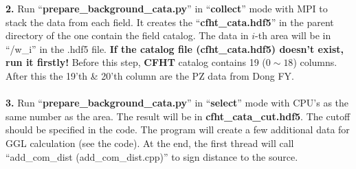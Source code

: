 \documentclass{article}
\begin{document}
\noindent\textbf{2.} Run ``\textbf{prepare\_background\_cata.py}'' in ``\textbf{collect}'' mode with MPI to stack the data from each field. It creates the ``\textbf{cfht\_cata.hdf5}'' in the parent directory of the one contain the field catalog. The data in $i$-th area will be in ``/w\_i'' in the .hdf5 file. \textbf{If the catalog file (cfht\_cata.hdf5) doesn't exist, run it firstly!} Before this step, \textbf{CFHT} catalog contains 19 ($0\sim 18$) columns. After this the 19'th \& 20'th column are the PZ data from Dong FY.
\\ \hspace*{\fill} \\

\noindent\textbf{3.} Run ``\textbf{prepare\_background\_cata.py}'' in ``\textbf{select}'' mode with CPU's as the same number as the area. The result will be in \textbf{cfht\_cata\_cut.hdf5}. The cutoff should be specified in the code. The program will create a few additional data for GGL calculation (see the code). At the end, the first thread will call ``add\_com\_dist (add\_com\_dist.cpp)'' to sign distance to the source.
\end{document}
